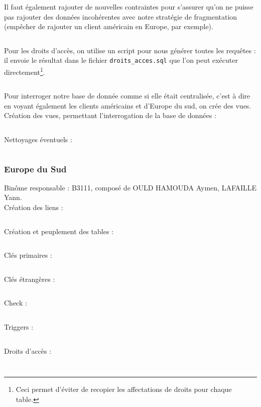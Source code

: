 \documentclass[10pt,a4paper]{article}
\theoremstyle{plain}
\begin{document}
\inputminted{sql}{INSA-DB12-EuropeNord-contraintes-fk.sql}
\inputminted{sql}{INSA-DB12-EuropeNord-trigger.sql}

Il faut également rajouter de nouvelles contraintes pour s'assurer qu'on ne puisse pas rajouter des données incohérentes avec notre stratégie de fragmentation (empêcher de rajouter un client américain en Europe, par exemple).

\inputminted{sql}{INSA-DB12-EuropeNord-contraintes.sql}

\newpage

Pour les droits d'accès, on utilise un script pour nous générer toutes les requêtes : il envoie le résultat dans le fichier \verb|droits_acces.sql| que l'on peut exécuter directement\footnote{Ceci permet d'éviter de recopier les affectations de droits pour chaque table.}.
\inputminted{sql}{INSA-DB12-droits-acces.sql}
\newpage

Pour interroger notre base de donnée comme si elle était centralisée, c'est à dire en voyant également les clients américains et d'Europe du sud, on crée des vues.\\

Création des vues, permettant l'interrogation de la base de données :
\inputminted{sql}{INSA-DB12-EuropeNord-vues.sql}
\newpage 

Nettoyages éventuels :
\inputminted{sql}{INSA-DB12-EuropeNord-drop.sql}
\newpage

\subsubsection{Europe du Sud}
Binôme responsable : B3111, composé de OULD HAMOUDA Aymen, LAFAILLE Yann.\\

Création des liens :
\inputminted{sql}{EUS_III-C-2-creation_liens.sql}
\newpage

Création et peuplement des tables :
\inputminted{sql}{EUS_III-C-3-creation_tables.sql}
\newpage

Clés primaires : 
\inputminted{sql}{EUS_III-C-5-Primary_key.sql}
\newpage

Clés étrangères :
\inputminted{sql}{EUS_III-C-5_foreign_key.sql}
\newpage

Check :
\inputminted{sql}{EUS_III-C-5_check.sql}
\newpage

Triggers : 
\inputminted{sql}{EUS_III-C-5_trigger.sql}
\newpage

Droits d'accès : 
\inputminted{sql}{EUS_III-C-6.sql}
\inputminted{sql}{EUS_III-C-6_2.sql}
\newpage
\end{document}
